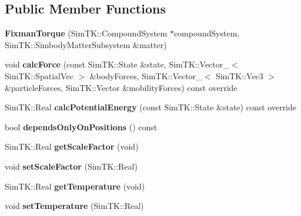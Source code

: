 \subsection*{Public Member Functions}
\begin{DoxyCompactItemize}
\item 
{\bfseries Fixman\+Torque} (Sim\+T\+K\+::\+Compound\+System $\ast$compound\+System, Sim\+T\+K\+::\+Simbody\+Matter\+Subsystem \&matter)\hypertarget{classFixmanTorque_a9d1922bbfbf57ff7e5ba329911819b63}{}\label{classFixmanTorque_a9d1922bbfbf57ff7e5ba329911819b63}

\item 
void {\bfseries calc\+Force} (const Sim\+T\+K\+::\+State \&state, Sim\+T\+K\+::\+Vector\+\_\+$<$ Sim\+T\+K\+::\+Spatial\+Vec $>$ \&body\+Forces, Sim\+T\+K\+::\+Vector\+\_\+$<$ Sim\+T\+K\+::\+Vec3 $>$ \&particle\+Forces, Sim\+T\+K\+::\+Vector \&mobility\+Forces) const override\hypertarget{classFixmanTorque_ace34df627e9380c393641d218348e4dc}{}\label{classFixmanTorque_ace34df627e9380c393641d218348e4dc}

\item 
Sim\+T\+K\+::\+Real {\bfseries calc\+Potential\+Energy} (const Sim\+T\+K\+::\+State \&state) const override\hypertarget{classFixmanTorque_a2b632689cbc3c2886f0a27f9fbeb27bb}{}\label{classFixmanTorque_a2b632689cbc3c2886f0a27f9fbeb27bb}

\item 
bool {\bfseries depends\+Only\+On\+Positions} () const \hypertarget{classFixmanTorque_ac751a14d42e46b96c26b935d64da27bd}{}\label{classFixmanTorque_ac751a14d42e46b96c26b935d64da27bd}

\item 
Sim\+T\+K\+::\+Real {\bfseries get\+Scale\+Factor} (void)\hypertarget{classFixmanTorque_a4330675bc902181bf25fcb1d75a1679e}{}\label{classFixmanTorque_a4330675bc902181bf25fcb1d75a1679e}

\item 
void {\bfseries set\+Scale\+Factor} (Sim\+T\+K\+::\+Real)\hypertarget{classFixmanTorque_a29c4bc51ed97d1f4223a5bcad3bd4fba}{}\label{classFixmanTorque_a29c4bc51ed97d1f4223a5bcad3bd4fba}

\item 
Sim\+T\+K\+::\+Real {\bfseries get\+Temperature} (void)\hypertarget{classFixmanTorque_a6d3bf8d4cb667226a9e320f59a4efc5f}{}\label{classFixmanTorque_a6d3bf8d4cb667226a9e320f59a4efc5f}

\item 
void {\bfseries set\+Temperature} (Sim\+T\+K\+::\+Real)\hypertarget{classFixmanTorque_a6e730f7d96c50020c793df3f4105997c}{}\label{classFixmanTorque_a6e730f7d96c50020c793df3f4105997c}

\end{DoxyCompactItemize}
